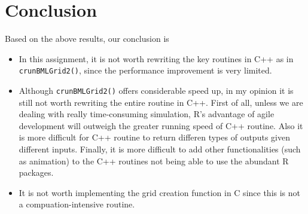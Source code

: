 \documentclass{article}
\begin{document}
\section{Conclusion}
Based on the above results, our conclusion is
\begin{itemize}
    \item In this assignment, it is not worth rewriting the key routines in C++
    as in \texttt{crunBMLGrid2()}, since the performance improvement is very
    limited.
    \item Although \texttt{crunBMLGrid2()} offers considerable speed up, in my
    opinion it is still not worth rewriting the entire routine in C++. First of
    all, unless we are dealing with really time-consuming simulation, R's
    advantage of agile development will outweigh the greater running speed of
    C++ routine. Also it is more difficult for C++ routine to return
    differen types of outputs given different inputs. Finally, it is more
    difficult to add other functionalities (such as animation) to the C++
    routines not being able to use the abundant R packages.
    \item It is not worth implementing the grid creation function in C since
    this is not a compuation-intensive routine.
\end{itemize}




\end{document}
